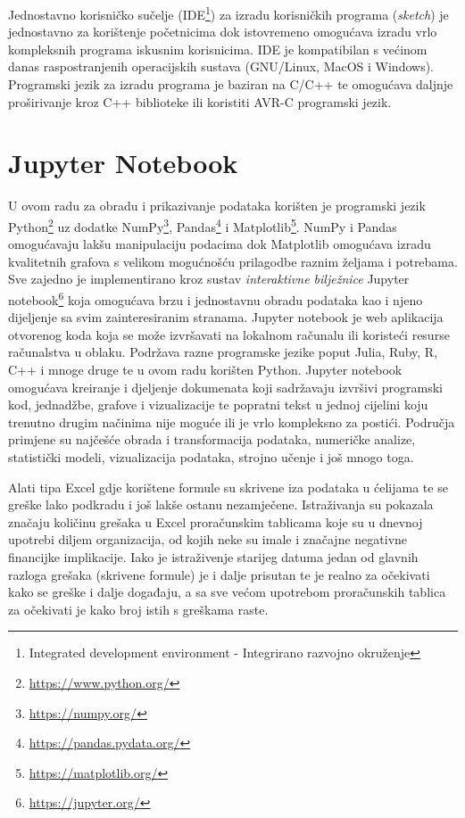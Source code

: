 Jednostavno korisničko sučelje (IDE\footnote{Integrated development environment - Integrirano razvojno okruženje}) za izradu korisničkih programa (\textit{sketch}) je jednostavno za korištenje početnicima dok istovremeno omogućava izradu vrlo kompleksnih programa iskusnim korisnicima. 
IDE je kompatibilan s većinom danas raspostranjenih operacijskih sustava (GNU/Linux, MacOS i Windows).
Programski jezik za izradu programa je baziran na C/C++ te omogućava daljnje proširivanje kroz C++ biblioteke ili koristiti AVR-C programski jezik.

\section{Jupyter Notebook}
U ovom radu za obradu i prikazivanje podataka korišten je programski jezik Python\footnote{\url{https://www.python.org/}} uz dodatke NumPy\footnote{\url{https://numpy.org/}}, Pandas\footnote{\url{https://pandas.pydata.org/}} i Matplotlib\footnote{\url{https://matplotlib.org/}}.
NumPy i Pandas omogućavaju lakšu manipulaciju podacima dok Matplotlib omogućava izradu kvalitetnih grafova s velikom mogućnošću prilagodbe raznim željama i potrebama.
Sve zajedno je implementirano kroz sustav \emph{interaktivne bilježnice} Jupyter notebook\footnote{\url{https://jupyter.org/}} koja omogućava brzu i jednostavnu obradu podataka kao i njeno dijeljenje sa svim zainteresiranim stranama.
Jupyter notebook je web aplikacija otvorenog koda koja se može izvršavati na lokalnom računalu ili koristeći resurse računalstva u oblaku.
Podržava razne programske jezike poput Julia, Ruby, R, C++ i mnoge druge te u ovom radu korišten Python.
Jupyter notebook omogućava kreiranje i djeljenje dokumenata koji sadržavaju izvršivi programski kod, jednadžbe, grafove i vizualizacije te popratni tekst u jednoj cijelini koju trenutno drugim načinima nije moguće ili je vrlo kompleksno za postići.
Područja primjene su najčešće obrada i transformacija podataka, numeričke analize, statistički modeli, vizualizacija podataka, strojno učenje i još mnogo toga.

Alati tipa Excel gdje korištene formule su skrivene iza podataka u ćelijama te se greške lako podkradu i još lakše ostanu nezamječene. 
Istraživanja su pokazala značaju količinu grešaka u Excel proračunskim tablicama koje su u dnevnoj upotrebi diljem organizacija, od kojih neke su imale i značajne negativne financijke implikacije\cite{panko1998we}. 
Iako je istraživenje starijeg datuma jedan od glavnih razloga grešaka (skrivene formule) je i dalje prisutan te je realno za očekivati kako se greške i dalje događaju, a sa sve većom upotrebom proračunskih tablica za očekivati je kako broj istih s greškama raste.

